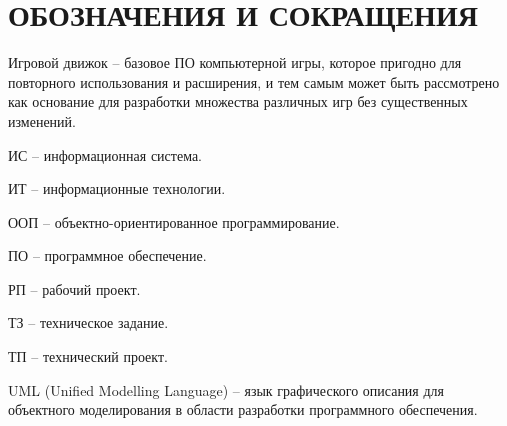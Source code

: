 \section*{ОБОЗНАЧЕНИЯ И СОКРАЩЕНИЯ}

Игровой движок -- базовое ПО компьютерной игры, которое пригодно для повторного использования и расширения, и тем самым может быть рассмотрено как основание для разработки множества различных игр без существенных изменений.

ИС -- информационная система.

ИТ -- информационные технологии. 

ООП -- объектно-ориентированное программирование.

ПО -- программное обеспечение.

РП -- рабочий проект.

ТЗ -- техническое задание.

ТП -- технический проект.

UML (Unified Modelling Language) -- язык графического описания для объектного моделирования в области разработки программного обеспечения.
